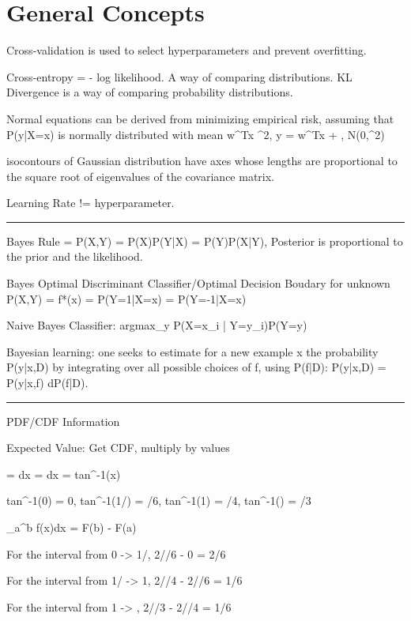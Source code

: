 \documentclass[a4paper,twoside,twocolumn]{article}
\begin{document}
\section*{General Concepts}
\label{sec-14}
\setlength{\parindent}{0pt}
{\scriptsize

Cross-validation is used to select hyperparameters and prevent overfitting.

Cross-entropy = - log likelihood. A way of comparing distributions. KL Divergence is a way of comparing probability distributions.

Normal equations can be derived from minimizing empirical risk, assuming that P(y|X=x) is normally distributed with mean w^Tx  \sigma^2, y = w^Tx + \epsilon,  \epsilon \approx N(0,\sigma^2)

isocontours of Gaussian distribution have axes whose lengths are proportional to the square root of eigenvalues of the covariance matrix.

Learning Rate != hyperparameter.

\noindent\rule{8cm}{0.4pt}

Bayes Rule = P(X,Y) = P(X)P(Y|X) = P(Y)P(X|Y), Posterior is proportional to the prior and the likelihood.

Bayes Optimal Discriminant Classifier/Optimal Decision Boudary for unknown P(X,Y) = f*(x) = P(Y=1|X=x) = P(Y=-1|X=x)

Naive Bayes Classifier: argmax_y \prod P(X=x_i | Y=y_i)P(Y=y)

Bayesian learning: one seeks to estimate for a new example x the probability P(y|x,D) by integrating over all possible choices of f, using P(f|D): P(y|x,D) = \int P(y|x,f) dP(f|D).

\noindent\rule{8cm}{0.4pt}

PDF/CDF Information

Expected Value: Get CDF, multiply by values

= \int {}dx
= \int {}dx
= tan^{-1}(x)

tan^{-1}(0) = 0,
tan^{-1}(1/) = \pi/6,
tan^{-1}(1) = \pi/4,
tan^{-1}() = \pi/3

\int_a^b f(x)dx = F(b) - F(a)

For the interval from 0 -> 1/,
2/\pi * \pi/6 - 0 = 2/6

For the interval from 1/ -> 1,
2/\pi * \pi/4 - 2/\pi * \pi/6 = 1/6

For the interval from 1 -> ,
2/\pi * \pi/3 - 2/\pi * \pi/4 = 1/6


}
\end{document}
